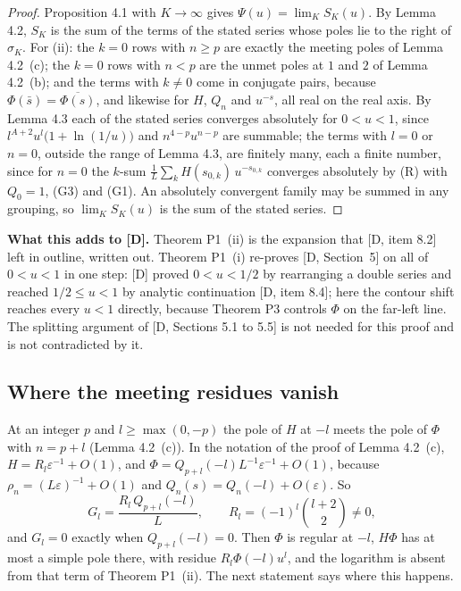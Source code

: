 \documentclass[11pt]{article}
\begin{document}
\begin{proof}
Proposition 4.1 with $K\to\infty$ gives $\Psi(u)=\lim_KS_K(u)$. By Lemma 4.2, $S_K$ is the sum of the terms of the stated series whose poles lie to the right of $\sigma_K$. For (ii): the $k=0$ rows with $n\ge p$ are exactly the meeting poles of Lemma 4.2~(c); the $k=0$ rows with $n<p$ are the unmet poles at $1$ and $2$ of Lemma 4.2~(b); and the terms with $k\ne0$ come in conjugate pairs, because $\Phi(\bar s)=\overline{\Phi(s)}$, and likewise for $H$, $Q_n$ and $u^{-s}$, all real on the real axis. By Lemma 4.3 each of the stated series converges absolutely for $0<u<1$, since $l^{A+2}u^l\bigl(1+\ln(1/u)\bigr)$ and $n^{4-p}u^{n-p}$ are summable; the terms with $l=0$ or $n=0$, outside the range of Lemma 4.3, are finitely many, each a finite number, since for $n=0$ the $k$-sum $\frac1L\sum_kH(s_{0,k})\,u^{-s_{0,k}}$ converges absolutely by (R) with $Q_0=1$, (G3) and (G1). An absolutely convergent family may be summed in any grouping, so $\lim_KS_K(u)$ is the sum of the stated series.
\end{proof}

\noindent\textbf{What this adds to [D].} Theorem P1~(ii) is the expansion that [D, item 8.2] left in outline, written out. Theorem P1~(i) re-proves [D, Section~5] on all of $0<u<1$ in one step: [D] proved $0<u<1/2$ by rearranging a double series and reached $1/2\le u<1$ by analytic continuation [D, item 8.4]; here the contour shift reaches every $u<1$ directly, because Theorem P3 controls $\Phi$ on the far-left line. The splitting argument of [D, Sections 5.1 to 5.5] is not needed for this proof and is not contradicted by it.

\subsection{Where the meeting residues vanish}\label{sec:chain}

At an integer $p$ and $l\ge\max(0,-p)$ the pole of $H$ at $-l$ meets the pole of $\Phi$ with $n=p+l$ (Lemma 4.2~(c)). In the notation of the proof of Lemma 4.2~(c), $H=R_l\varepsilon^{-1}+O(1)$, and $\Phi=Q_{p+l}(-l)L^{-1}\varepsilon^{-1}+O(1)$, because $\rho_n=(L\varepsilon)^{-1}+O(1)$ and $Q_n(s)=Q_n(-l)+O(\varepsilon)$. So
\[
G_l=\frac{R_l\,Q_{p+l}(-l)}{L},\qquad R_l=(-1)^l\binom{l+2}{2}\ne0,
\]
and $G_l=0$ exactly when $Q_{p+l}(-l)=0$. Then $\Phi$ is regular at $-l$, $H\Phi$ has at most a simple pole there, with residue $R_l\Phi(-l)u^l$, and the logarithm is absent from that term of Theorem P1~(ii). The next statement says where this happens.
\end{document}
